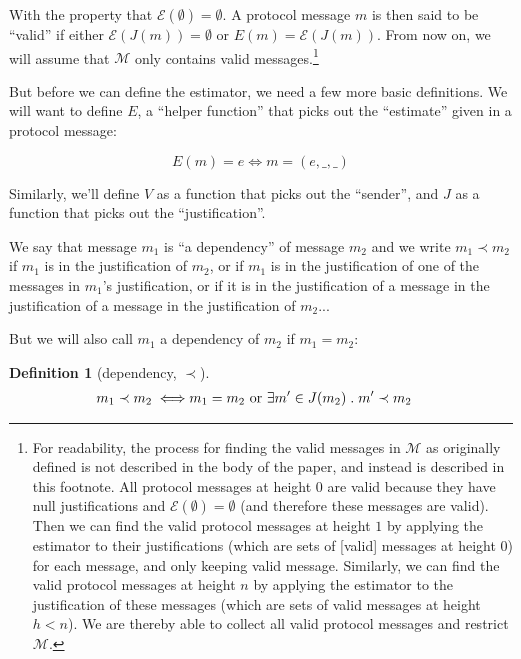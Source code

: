 \documentclass{article}
\theoremstyle{definition}
\newtheorem{defn}{Definition}[section]
\begin{document}
With the property that $\mathcal{E}(\emptyset) = \emptyset$. A protocol message $m$ is then said to be ``valid'' if either $\mathcal{E}(J(m)) = \emptyset$ or $E(m) = \mathcal{E}(J(m))$. From now on, we will assume that $\mathcal{M}$ only contains valid messages.\footnote{For readability, the process for finding the valid messages in $\mathcal{M}$ as originally defined is not described in the body of the paper, and instead is described in this footnote. All protocol messages at height $0$ are valid because they have null justifications and $\mathcal{E}(\emptyset) = \emptyset$ (and therefore these messages are valid). Then we can find the valid protocol messages at height $1$ by applying the estimator to their justifications (which are sets of [valid] messages at height 0) for each message, and only keeping valid message. Similarly, we can find the valid protocol messages at height $n$ by applying the estimator to the justification of these messages (which are sets of valid messages at height $h < n$). We are thereby able to collect all valid protocol messages and restrict $\mathcal{M}.$}


But before we can define the estimator, we need a few more basic definitions. We will want to define $E$, a ``helper function'' that picks out the ``estimate'' given in a protocol message:

$$
E(m) = e \iff m = (e, \_, \_)
$$

Similarly, we'll define $V$ as a function that picks out the ``sender'', and $J$ as a function that picks out the ``justification''.  

We say that message $m_1$ is ``a dependency'' of message $m_2$ and we write $m_1 \prec m_2$ if $m_1$ is in the justification of $m_2$, or if $m_1$ is in the justification of one of the messages in $m_1$'s justification, or if it is in the justification of a message in the justification of a message in the justification of $m_2$...

But we will also call $m_1$ a dependency of $m_2$ if $m_1 = m_2$:

\begin{defn}[dependency, $\prec$]
\begin{equation*}
\begin{split}
m_1 \prec m_2 \iff & m_1 = m_2 \text{ or } \exists m' \in J(m_2) \hspace{1mm} . \hspace{1mm} m' \prec m_2
\end{split}
\end{equation*}
\end{defn}
\end{document}
